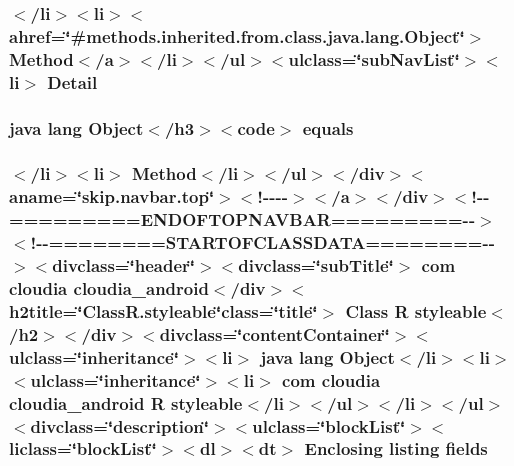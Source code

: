 \hypertarget{_r_8styleable_8html_aed0df2ae11502bf9389ac3cf53b1c0f6}{
\subsubsection[{Detail}]{\setlength{\rightskip}{0pt plus 5cm}$<$/li$>$$<$li$>$$<$ahref=\char`\"{}\#methods.\-inherited.\-from.\-class.\-java.\-lang.\-Object\char`\"{}$>$ Method$<$/{\bf a}$>$$<$/li$>$$<$/ul$>$$<$ulclass=\char`\"{}sub\-Nav\-List\char`\"{}$>$$<$li$>$ Detail}}\label{_r_8styleable_8html_aed0df2ae11502bf9389ac3cf53b1c0f6}
\hypertarget{_r_8styleable_8html_a8974318cea585f72df717e0380ec7104}{
\subsubsection[{equals}]{\setlength{\rightskip}{0pt plus 5cm}java lang Object$<$/h3$>$$<$code$>$ equals}}\label{_r_8styleable_8html_a8974318cea585f72df717e0380ec7104}
\hypertarget{_r_8styleable_8html_a42ce07b357e63181611e0ab3e4d1beba}{
\subsubsection[{fields}]{\setlength{\rightskip}{0pt plus 5cm}$<$/li$>$$<$li$>$ Method$<$/li$>$$<$/ul$>$$<$/div$>$$<$aname=\char`\"{}skip.\-navbar.\-top\char`\"{}$>$$<$!-\/-\/-\/-\/$>$$<$/a$>$$<$/div$>$$<$!-\/-\/=========E\-N\-D\-O\-F\-T\-O\-P\-N\-A\-V\-B\-A\-R=========-\/-\/$>$$<$!-\/-\/========S\-T\-A\-R\-T\-O\-F\-C\-L\-A\-S\-S\-D\-A\-T\-A========-\/-\/$>$$<$divclass=\char`\"{}header\char`\"{}$>$$<$divclass=\char`\"{}sub\-Title\char`\"{}$>$ com cloudia cloudia\-\_\-android$<$/div$>$$<$h2title=\char`\"{}Class\-R.\-styleable\char`\"{}class=\char`\"{}title\char`\"{}$>$ Class {\bf R} {\bf styleable}$<$/h2$>$$<$/div$>$$<$divclass=\char`\"{}content\-Container\char`\"{}$>$$<$ulclass=\char`\"{}inheritance\char`\"{}$>$$<$li$>$ java lang Object$<$/li$>$$<$li$>$$<$ulclass=\char`\"{}inheritance\char`\"{}$>$$<$li$>$ com cloudia cloudia\-\_\-android {\bf R} {\bf styleable}$<$/li$>$$<$/ul$>$$<$/li$>$$<$/ul$>$$<$divclass=\char`\"{}description\char`\"{}$>$$<$ulclass=\char`\"{}block\-List\char`\"{}$>$$<$liclass=\char`\"{}block\-List\char`\"{}$>$$<$dl$>$$<${\bf dt}$>$ Enclosing listing fields}}\label{_r_8styleable_8html_a42ce07b357e63181611e0ab3e4d1beba}
